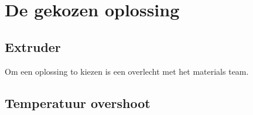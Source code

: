 \chapter{De gekozen oplossing}
\label{De_gekozen_oplossing}

\section{Extruder}

Om een oplossing to kiezen is een overlecht met het materials team. 

\section{Temperatuur overshoot}



